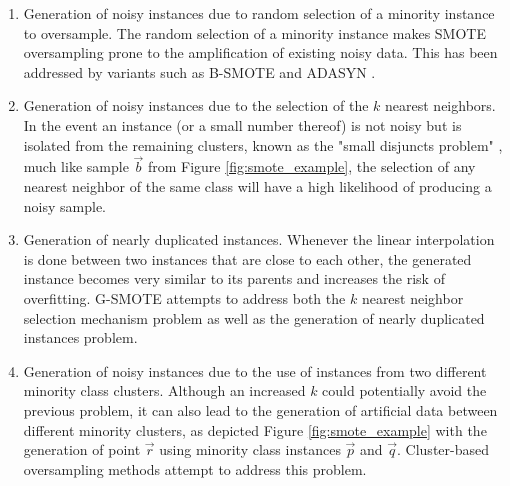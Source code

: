 \documentclass[preprint,12pt]{elsarticle}
\begin{document}
\begin{enumerate}
    \item Generation of noisy instances due to random selection of a
        minority instance to oversample. The random
        selection of a minority instance makes SMOTE
        oversampling prone to the amplification of existing noisy data. This
        has been addressed by variants such as B-SMOTE \cite{Han2005} and
        ADASYN \cite{HaiboHe2008}. 

    \item Generation of noisy instances due to the selection of the $k$
        nearest neighbors. In the event an instance
        (or a small number thereof) is not noisy but is isolated from the
        remaining clusters, known as the "small disjuncts problem"
        \cite{holte1989}, much like sample $\overrightarrow{b}$ from Figure
        \ref{fig:smote_example}, the selection of any nearest neighbor of the
        same class will have a high likelihood of producing a noisy sample.

    \item Generation of nearly duplicated instances. Whenever the linear
        interpolation is done between two instances that are close to each
        other, the generated instance becomes very similar to its parents and
        increases the risk of overfitting. G-SMOTE \cite{Douzas2019} attempts
        to address both the $k$ nearest neighbor selection mechanism problem
        as well as the generation of nearly duplicated instances problem. 

    \item Generation of noisy instances due to the use of
        instances from two different minority class clusters.
        Although an increased $k$ could potentially avoid the previous
        problem, it can also lead to the generation of artificial data between
        different minority clusters, as depicted Figure
        \ref{fig:smote_example} with the generation of point
        $\overrightarrow{r}$ using minority class instances $\overrightarrow{p}$ and $\overrightarrow{q}$.
        Cluster-based oversampling methods attempt to address this problem. 
\end{enumerate}
\end{document}
